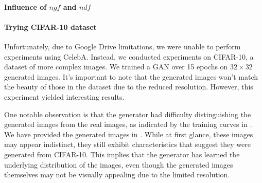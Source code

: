 
\paragraph*{Influence of $ngf$ and $ndf$}


\paragraph*{Trying CIFAR-10 dataset}

Unfortunately, due to Google Drive limitations, we were unable to perform experiments using CelebA. Instead, we conducted experiments on CIFAR-10, a dataset of more complex images. We trained a GAN over 15 epochs on $32 \times 32$ generated images. It's important to note that the generated images won't match the beauty of those in the dataset due to the reduced resolution. However, this experiment yielded interesting results.

One notable observation is that the generator had difficulty distinguishing the generated images from the real images, as indicated by the training curves in . We have provided the generated images in . While at first glance, these images may appear indistinct, they still exhibit characteristics that suggest they were generated from CIFAR-10. This implies that the generator has learned the underlying distribution of the images, even though the generated images themselves may not be visually appealing due to the limited resolution.

